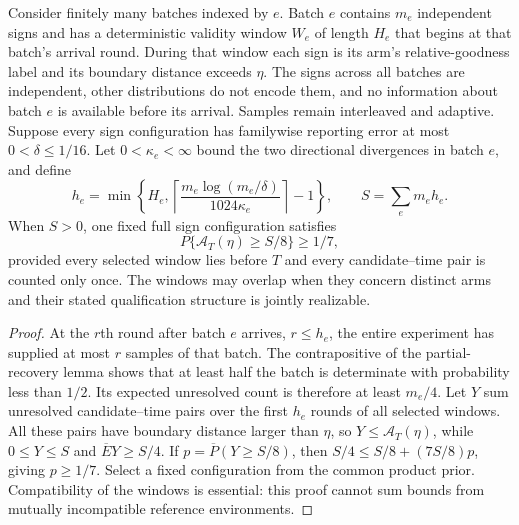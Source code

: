 \begin{proposition}
\label{prop:truncated_windows}
Consider finitely many batches indexed by $e$. Batch $e$ contains $m_e$
independent signs and has a deterministic validity window $W_e$ of length
$H_e$ that begins at that batch's arrival round. During that window each sign
is its arm's relative-goodness label and
its boundary distance exceeds $\eta$. The signs across all batches are
independent, other distributions do not encode them, and no information
about batch $e$ is available before its arrival. Samples remain interleaved
and adaptive. Suppose every sign configuration has familywise reporting error
at most $0<\delta\le1/16$. Let $0<\kappa_e<\infty$ bound the two directional
divergences in batch $e$, and define
\[
 h_e=\min\left\{H_e,
 \left\lceil\frac{m_e\log(m_e/\delta)}{1024\kappa_e}\right\rceil-1\right\},
 \qquad S=\sum_e m_eh_e.
\]
When $S>0$, one fixed full sign configuration satisfies
\[
 P\{\mathcal A_T(\eta)\ge S/8\}\ge1/7,
\]
provided every selected window lies before $T$ and every candidate--time pair
is counted only once. The windows may overlap when they concern distinct
arms and their stated qualification structure is jointly realizable.
\end{proposition}
\begin{proof}
At the $r$th round after batch $e$ arrives, $r\le h_e$, the entire experiment
has supplied at most $r$ samples of that batch. The contrapositive of the
partial-recovery lemma shows that at least half the batch is determinate with
probability less than $1/2$. Its expected unresolved count is therefore at
least $m_e/4$. Let $Y$ sum unresolved candidate--time pairs over the first
$h_e$ rounds of all selected windows. All these pairs have boundary distance
larger than $\eta$, so $Y\le\mathcal A_T(\eta)$, while $0\le Y\le S$ and
$\overline EY\ge S/4$. If $p=\overline P(Y\ge S/8)$, then
$S/4\le S/8+(7S/8)p$, giving $p\ge1/7$. Select a fixed configuration from
the common product prior. Compatibility of the windows is essential: this
proof cannot sum bounds from mutually incompatible reference environments.
\end{proof}
